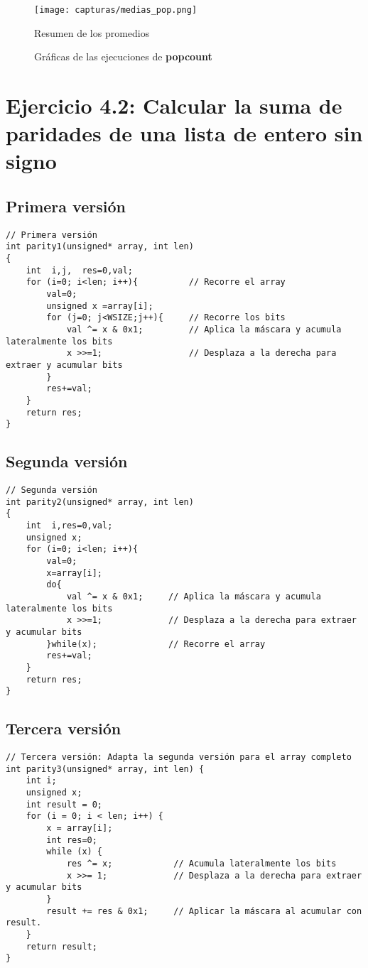 \begin{figure}[H] %
	\centering
	\texttt{[image: capturas/medias\_pop.png]} 
	\caption{Resumen de los promedios} 
	\label{fig:figura6}
\end{figure}

\begin{figure}[htbp]
	\centering
	\caption{Gráficas de las ejecuciones de \textbf{popcount}} \label{fig:lego}
\end{figure}


\newpage

\section{Ejercicio 4.2: Calcular la suma de paridades de una lista de entero sin signo}
\subsection{Primera versión}
\begin{lstlisting}
// Primera versión
int parity1(unsigned* array, int len)
{
	int  i,j,  res=0,val;
	for (i=0; i<len; i++){          // Recorre el array
		val=0;
		unsigned x =array[i];
		for (j=0; j<WSIZE;j++){     // Recorre los bits
			val ^= x & 0x1;         // Aplica la máscara y acumula lateralmente los bits
			x >>=1;                 // Desplaza a la derecha para extraer y acumular bits
		}
		res+=val;
	}
	return res;
}
\end{lstlisting}

\subsection{Segunda versión}
\begin{lstlisting}
// Segunda versión
int parity2(unsigned* array, int len)
{
	int  i,res=0,val;
	unsigned x;
	for (i=0; i<len; i++){
		val=0;
		x=array[i];
		do{
			val ^= x & 0x1;     // Aplica la máscara y acumula lateralmente los bits
			x >>=1;             // Desplaza a la derecha para extraer y acumular bits
		}while(x);              // Recorre el array
		res+=val;
	}
	return res;
}
\end{lstlisting}

\subsection{Tercera versión}
\begin{lstlisting}
// Tercera versión: Adapta la segunda versión para el array completo
int parity3(unsigned* array, int len) {
	int i;
	unsigned x;
	int result = 0;
	for (i = 0; i < len; i++) {
		x = array[i];
		int res=0;
		while (x) {
			res ^= x;            // Acumula lateralmente los bits
			x >>= 1;             // Desplaza a la derecha para extraer y acumular bits
		}
		result += res & 0x1;     // Aplicar la máscara al acumular con result.
	}
	return result;
}
\end{lstlisting}


